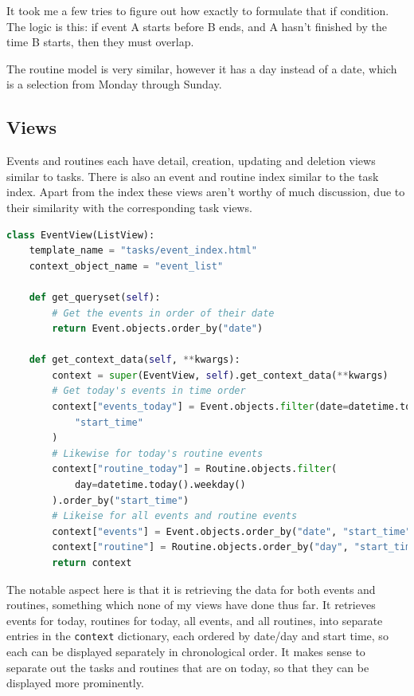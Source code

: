 \documentclass{article}
\begin{document}
It took me a few tries to figure out how exactly to formulate that if condition.
The logic is this:
if event A starts before B ends,
and A hasn't finished by the time B starts,
then they must overlap.

The routine model is very similar,
however it has a day instead of a date,
which is a selection from Monday through Sunday.

\subsection{Views}
Events and routines each have detail, creation, updating and deletion views similar to tasks.
There is also an event and routine index similar to the task index.
Apart from the index these views aren't worthy of much discussion,
due to their similarity with the corresponding task views.

\begin{lstlisting}[language=Python]
class EventView(ListView):
    template_name = "tasks/event_index.html"
    context_object_name = "event_list"

    def get_queryset(self):
        # Get the events in order of their date
        return Event.objects.order_by("date")

    def get_context_data(self, **kwargs):
        context = super(EventView, self).get_context_data(**kwargs)
        # Get today's events in time order
        context["events_today"] = Event.objects.filter(date=datetime.today()).order_by(
            "start_time"
        )
        # Likewise for today's routine events
        context["routine_today"] = Routine.objects.filter(
            day=datetime.today().weekday()
        ).order_by("start_time")
        # Likeise for all events and routine events
        context["events"] = Event.objects.order_by("date", "start_time")
        context["routine"] = Routine.objects.order_by("day", "start_time")
        return context
\end{lstlisting}

The notable aspect here is that it is retrieving the data for both events and routines,
something which none of my views have done thus far.
It retrieves events for today,
routines for today,
all events,
and all routines,
into separate entries in the \texttt{context} dictionary,
each ordered by date/day and start time,
so each can be displayed separately in chronological order.
It makes sense to separate out the tasks and routines that are on today,
so that they can be displayed more prominently.
\end{document}
